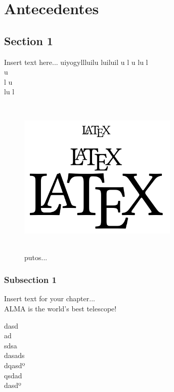 \chapter{Antecedentes}
\label{ch1}

\section{Section 1}

Insert text here...
uiyogyllluilu
luiluil
u
l
u
lu
l\\
u\\
l
u\\
lu
l

\begin{figure}[h]
    \centering
    \includegraphics[width=3.0in, height=3.0in]{Figure/latex_fig_1.png}
    \caption{putos...}
    \label{fig:enter-label}
\end{figure}


\subsection{Subsection 1}

    Insert text for your chapter...\\
    \ac{ALMA} is the world's best telescope!

dasd \\
ad\\
sdsa\\dasads\\dqasdº\\qsdad\\dasdº\\

